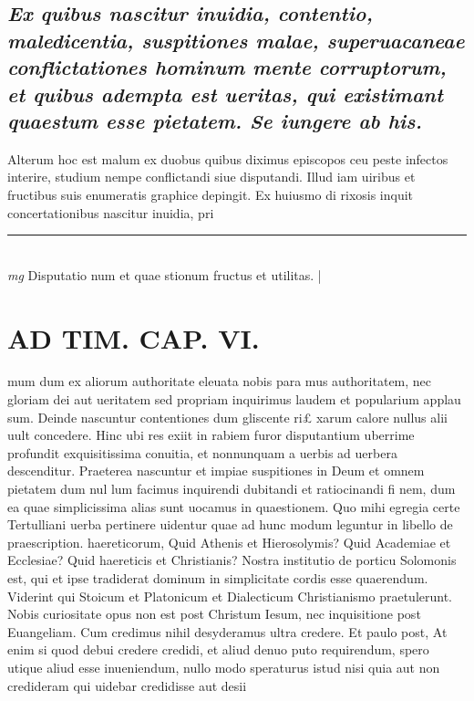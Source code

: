 \documentclass{article}
\begin{document}
\begin{pages}
\subsection*{\textit{Ex quibus nascitur inuidia, contentio, maledicentia, suspitiones malae, superuacaneae conflictationes hominum mente corruptorum, et quibus adempta est ueritas, qui existimant quaestum esse pietatem. Se iungere ab his. }}\pstart Alterum hoc est malum ex duobus quibus diximus episcopos ceu peste infectos interire, studium nempe conflictandi siue disputandi. Illud iam uiribus et fructibus suis enumeratis graphice depingit. Ex huiusmo di rixosis inquit concertationibus nascitur inuidia, pri  \pend
\vspace{0.5cm}\noindent
\vspace{0.2cm}\rule{1cm}{0.2pt}\\ 
\hspace{0.2cm}\textit{mg}
\footnotesize Disputatio num et quae stionum fructus et utilitas. 
\normalsize| 
\section*{AD TIM. CAP. VI. }
\marginpar{[ p.166 ]}\pstart mum dum ex aliorum authoritate eleuata nobis para mus authoritatem, nec gloriam dei aut ueritatem sed propriam inquirimus laudem et popularium applau sum. Deinde nascuntur contentiones dum gliscente ri£ xarum calore nullus alii uult concedere. Hinc ubi res exiit in rabiem furor disputantium uberrime profundit exquisitissima conuitia, et nonnunquam a uerbis ad uerbera descenditur. Praeterea nascuntur et impiae suspitiones in Deum et omnem pietatem dum nul lum facimus inquirendi dubitandi et ratiocinandi fi nem, dum ea quae simplicissima alias sunt uocamus in quaestionem. Quo mihi egregia certe Tertulliani uerba pertinere uidentur quae ad hunc modum leguntur in libello de praescription. haereticorum, Quid Athenis et Hierosolymis? Quid Academiae et Ecclesiae? Quid haereticis et Christianis? Nostra institutio de porticu Solomonis est, qui et ipse tradiderat dominum in simplicitate cordis esse quaerendum. Viderint qui Stoicum et Platonicum et Dialecticum Christianismo praetulerunt. Nobis curiositate opus non est post Christum Iesum, nec inquisitione post Euangeliam. Cum credimus nihil desyderamus ultra credere. Et paulo post, At enim si quod debui credere credidi, et aliud denuo puto requirendum, spero utique aliud esse inueniendum, nullo modo speraturus istud nisi quia aut non credideram qui uidebar credidisse aut desii  \pend

\end{pages}
\end{document}
